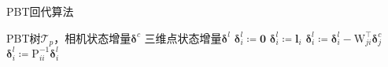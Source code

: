 \begin{algorithm}
\caption{PBT回代算法}
\begin{algorithmic}
    \Require PBT树$\mathcal{T}_p$，相机状态增量$\bm{\delta}^c$
    \Ensure 三维点状态增量$\bm{\delta}^l$
            \State $\bm{\delta}^l_i \coloneqq \bm{0}$
        \Else
            \State $\bm{\delta}^l_i \coloneqq \bm{l}_i$
                \State
                {
                    $\bm{\delta}^l_i \coloneqq
                     \bm{\delta}^l_i - \mathrm{W}^\top_{ji}\bm{\delta}^c_j$
                }
            \EndFor
            \State
            {
                $\bm{\delta}^l_i \coloneqq
                 \mathrm{P}_{ii}^{-1} \bm{\delta}^l_i$
            }
        \EndIf
    \EndFor
\end{algorithmic}
\label{alg:pbt}
\end{algorithm}

